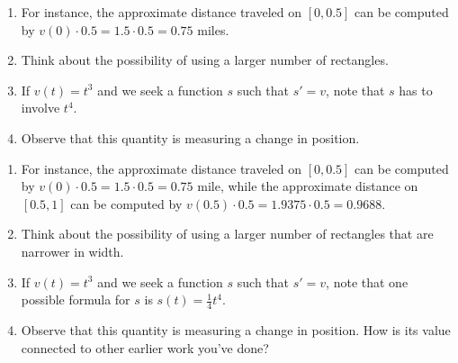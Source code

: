 \begin{smallhint}
\begin{enumerate}
	\item For instance, the approximate distance traveled on $[0,0.5]$ can be computed by $v(0) \cdot 0.5 = 1.5 \cdot 0.5 = 0.75$ miles.
	\item Think about the possibility of using a larger number of rectangles.
	\item If $v(t) = t^3$ and we seek a function $s$ such that $s' = v$, note that $s$ has to involve $t^4$.
	\item Observe that this quantity is measuring a change in position.
\end{enumerate}
\end{smallhint}
\begin{bighint}
\begin{enumerate}
	\item For instance, the approximate distance traveled on $[0,0.5]$ can be computed by $v(0) \cdot 0.5 = 1.5 \cdot 0.5 = 0.75$ mile, while the approximate distance on $[0.5,1]$ can be computed by $v(0.5) \cdot 0.5 = 1.9375 \cdot 0.5 = 0.9688$.
	\item Think about the possibility of using a larger number of rectangles that are narrower in width.
	\item If $v(t) = t^3$ and we seek a function $s$ such that $s' = v$, note that one possible formula for $s$ is $s(t) = \frac{1}{4}t^4$.
	\item Observe that this quantity is measuring a change in position.  How is its value connected to other earlier work you've done?
\end{enumerate}
\end{bighint}
